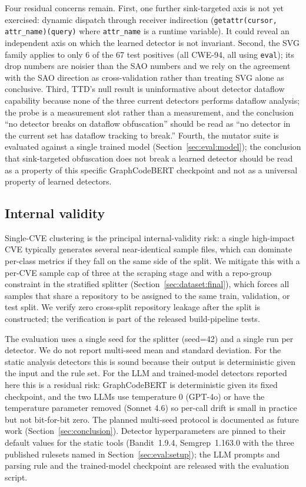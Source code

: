 Four residual concerns remain. First, one further sink-targeted
axis is not yet exercised: dynamic dispatch through receiver
indirection (\texttt{getattr(cursor, attr\_name)(query)} where
\texttt{attr\_name} is a runtime variable). It could reveal an
independent axis on which the learned detector is not invariant.
Second, the SVG family applies to only 6 of the 67 test positives
(all CWE-94, all using \texttt{eval}); its drop numbers are noisier
than the SAO numbers and we rely on the agreement with the SAO
direction as cross-validation rather than treating SVG alone as
conclusive. Third, TTD's null result is uninformative about
detector dataflow capability because none of the three current
detectors performs dataflow analysis; the probe is a measurement
slot rather than a measurement, and the conclusion ``no detector
breaks on dataflow obfuscation'' should be read as ``no detector
in the current set has dataflow tracking to break.'' Fourth, the
mutator suite is evaluated against a single trained model
(Section~\ref{sec:eval:model}); the conclusion that sink-targeted
obfuscation does not break a learned detector should be read as a
property of this specific GraphCodeBERT checkpoint and not as a
universal property of learned detectors.

\subsection{Internal validity}
\label{sec:threats:internal}

Single-CVE clustering is the principal internal-validity risk: a single
high-impact CVE typically generates several near-identical sample files,
which can dominate per-class metrics if they fall on the same side of
the split. We mitigate this with a per-CVE sample cap of three at the
scraping stage and with a repo-group constraint in the stratified
splitter (Section~\ref{sec:dataset:final}), which forces all samples
that share a repository to be assigned to the same train, validation,
or test split. We verify zero cross-split repository leakage after the
split is constructed; the verification is part of the released
build-pipeline tests.

The evaluation uses a single seed for the splitter (seed=42) and a
single run per detector. We do not report multi-seed mean and standard
deviation. For the static analysis detectors this is sound because
their output is deterministic given the input and the rule set. For
the LLM and trained-model detectors reported here this is a residual
risk: GraphCodeBERT is deterministic given its fixed checkpoint, and
the two LLMs use temperature 0 (GPT-4o) or have the temperature
parameter removed (Sonnet 4.6) so per-call drift is small in
practice but not bit-for-bit zero. The planned multi-seed protocol
is documented as future work (Section~\ref{sec:conclusion}).
Detector hyperparameters are pinned to their default values for the
static tools (Bandit~1.9.4, Semgrep~1.163.0 with the three published
rulesets named in Section~\ref{sec:eval:setup}); the LLM prompts and
parsing rule and the trained-model checkpoint are released with the
evaluation script.

